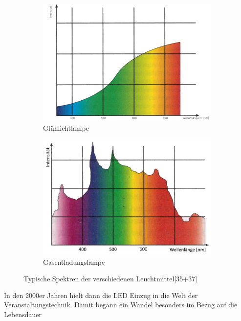 \documentclass[11pt]{scrartcl}
\begin{document}
\begin{figure}[H]
    \centering
    \begin{subfigure}[b]{0.49\textwidth}
        \includegraphics[width=\textwidth]{images/conventional_spectrum.png}
        \caption{Glühlichtlampe}
    \end{subfigure}
    \hfill 
    \begin{subfigure}[b]{0.49\textwidth}
        \includegraphics[width=\textwidth]{images/HMI_Spectrum.png}
        \caption{Gasentladungslampe}
    \end{subfigure}
    \caption{Typische Spektren der verschiedenen Leuchtmittel\cite{showlicht}[35+37]}\label{fig:lightEmiiterSpects}
\end{figure}
\noindent
In den 2000er Jahren hielt dann die LED Einzug in die Welt der Veranstaltungstechnik. Damit begann ein Wandel besonders im Bezug auf die Lebensdauer
\end{document}
